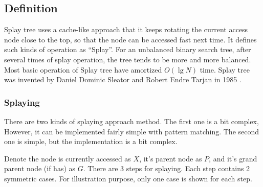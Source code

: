 \documentclass{article}
\begin{document}
\subsection{Definition}

Splay tree uses a cache-like approach that it keeps rotating the current
access node close to the top, so that the node can be accessed fast
next time. It defines such kinds of operation as ``Splay''. For an
unbalanced binary search tree, after several times of splay operation, the
tree tends to be more and more balanced. Most basic operation of
Splay tree have amortized $O(\lg N)$ time. Splay tree was invented
by Daniel Dominic Sleator and Robert Endre Tarjan in 1985\cite{wiki-splay-tree}
\cite{self-adjusting-trees}.

\subsubsection{Splaying}

There are two kinds of splaying approach method. The first one is
a bit complex, However, it can be implemented fairly simple with
pattern matching. The second one is simple, but the implementation
is a bit complex.

Denote the node is currently accessed as $X$, it's parent node as $P$,
and it's grand parent node (if has) as $G$. There are 3 steps for
splaying. Each step contains 2 symmetric cases. For illustration
purpose, only one case is shown for each step.
\end{document}
